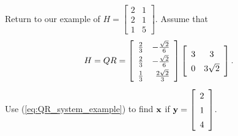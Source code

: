 \begin{pactivity}
\begin{comment}
\end{comment}

\item Return to our example of $H = \left[ \begin{array}{cc} 2&1\\2&1\\1&5 \end{array} \right]$. Assume that 
\[H = QR =  \left[ \renewcommand{\arraystretch}{1.4} \begin{array}{cr} \frac{2}{3}& -\frac{\sqrt{2}}{6} \\ \frac{2}{3}& -\frac{\sqrt{2}}{6} \\ \frac{1}{3}& \frac{2\sqrt{2}}{3} \end{array} \right] \left[ \begin{array}{cc} 3&3\\0&3\sqrt{2} \end{array} \right].\]
Use (\ref{eq:QR_system_example}) to find $\mathbf{x}$ if $\vy = \left[ \begin{array}{c} 2\\1\\4 \end{array} \right]$. 

\begin{comment}


\end{comment}
\end{pactivity}

